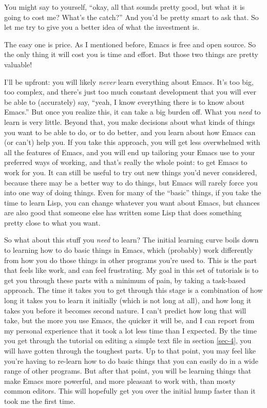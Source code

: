 \documentclass{article}
\begin{document}
You might say to yourself, ``okay, all that sounds pretty good, but what it is going to cost me? What's the catch?'' And you'd be pretty smart to ask that. So let me try to give you a better idea of what the investment is.

The easy one is price.  As I mentioned before, Emacs is free and open source.  So the only thing it will cost you is time and effort.  But those two things are pretty valuable!

I'll be upfront: you will likely \emph{never} learn everything about Emacs. It's too big, too complex, and there's just too much constant development that you will ever be able to (accurately) say, ``yeah, I know everything there is to know about Emacs.'' But once you realize this, it can take a big burden off.  What you \emph{need} to learn is very little. Beyond that, you make decisions about what kinds of things you want to be able to do, or to do better, and you learn about how Emacs can (or can't) help you. If you take this approach, you will get less overwhelmed with all the features of Emacs, and you will end up tailoring your Emacs use to your preferred ways of working, and that's really the whole point: to get Emacs to work for you.  It can still be useful to try out new things you'd never considered, because there may be a better way to do things, but Emacs will rarely force you into one way of doing things.  Even for many of the ``basic'' things, if you take the time to learn Lisp, you can change whatever you want about Emacs, but chances are also good that someone else has written some Lisp that does something pretty close to what you want.

So what about this stuff you \emph{need} to learn?  The initial learning curve boils down to learning how to do basic things in Emacs, which (probably) work differently from how you do those things in other programs you're used to.  This is the part that feels like work, and can feel frustrating. My goal in this set of tutorials is to get you through these parts with a minimum of pain, by taking a task-based approach. The time it takes you to get through this stage is a combination of how long it takes you to learn it initially (which is not long at all), and how long it takes you before it becomes second nature. I can't predict how long that will take, but the more you use Emacs, the quicker it will be, and I can report from my personal experience that it took a lot less time than I expected.  By the time you get through the tutorial on editing a simple text file in section \ref{sec-4}, you will have gotten through the toughest parts. Up to that point, you may feel like you're having to re-learn how to do basic things that you can easily do in a wide range of other programs. But after that point, you will be learning things that make Emacs more powerful, and more pleasant to work with, than mosty common editors.  This will hopefully get you over the initial hump faster than it took me the first time.
\end{document}
